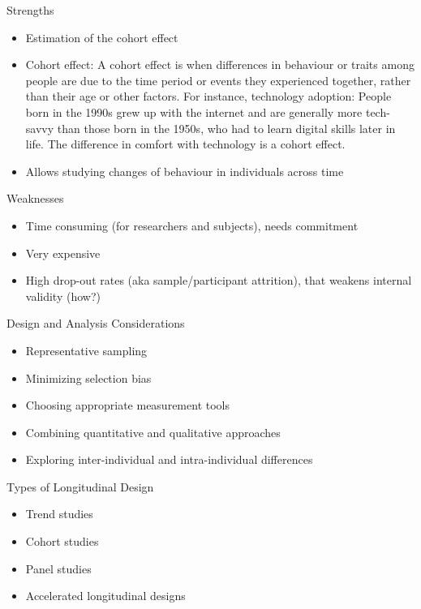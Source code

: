 \documentclass[
  ignorenonframetext,
  aspectratio=169,
]{beamer}
\providecommand{\tightlist}{%
  \setlength{\itemsep}{0pt}\setlength{\parskip}{0pt}}\usepackage{longtable,booktabs,array}
\begin{document}
\begin{frame}{Strengths}
\label{strengths}
\begin{itemize}[<+->]
\tightlist
\item
  Estimation of the cohort effect
\item
  Cohort effect: A cohort effect is when differences in behaviour or
  traits among people are due to the time period or events they
  experienced together, rather than their age or other factors. For
  instance, technology adoption: People born in the 1990s grew up with
  the internet and are generally more tech-savvy than those born in the
  1950s, who had to learn digital skills later in life. The difference
  in comfort with technology is a cohort effect.
\item
  Allows studying changes of behaviour in individuals across time
\end{itemize}
\end{frame}

\begin{frame}{Weaknesses}
\label{weaknesses}
\begin{itemize}[<+->]
\tightlist
\item
  Time consuming (for researchers and subjects), needs commitment
\item
  Very expensive
\item
  High drop-out rates (aka sample/participant attrition), that weakens
  internal validity (how?)
\end{itemize}
\end{frame}

\begin{frame}{Design and Analysis Considerations}
\label{design-and-analysis-considerations}
\begin{itemize}[<+->]
\tightlist
\item
  Representative sampling
\item
  Minimizing selection bias
\item
  Choosing appropriate measurement tools
\item
  Combining quantitative and qualitative approaches
\item
  Exploring inter-individual and intra-individual differences
\end{itemize}
\end{frame}

\begin{frame}{Types of Longitudinal Design}
\label{types-of-longitudinal-design}
\begin{itemize}
\tightlist
\item
  Trend studies
\item
  Cohort studies
\item
  Panel studies
\item
  Accelerated longitudinal designs
\end{itemize}
\end{frame}
\end{document}
